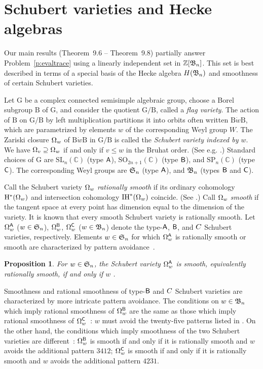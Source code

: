 \documentclass[11pt]{article}
\newtheorem{prop}[theo]{Proposition}
\theoremstyle{definition}
\numberwithin{equation}{section}
\begin{document}
\section{Schubert varieties and Hecke algebras}\label{s:schuberthecke}

Our main results (Theorem~9.6 --
Theorem~9.8)
partially answer
Problem~\ref{p:evaltrace} using a linearly independent set in $\mathbb{Z}[\mathfrak{B}_n]$.
This set is best described in terms of a special basis of the
Hecke algebra $H(\mathfrak{B}_n)$ and smoothness of certain Schubert varieties.


Let $\mathrm G$ be a complex connected semisimple algebraic group,
choose a Borel subgroup $\mathrm B$ of $\mathrm G$, and consider
the quotient
$\mathrm G/\mathrm B$,
called a {\em flag variety}.
The action of $\mathrm B$ on $\mathrm G/\mathrm B$ by left multiplication 
partitions
it
into orbits often written
$\mathrm B\dot w\mathrm B$,
which are
parametrized by elements $w$ of the corresponding Weyl group $W$.
The Zariski closure $\Omega_{w}$ of
$\mathrm B \dot w \mathrm B$
in $\mathrm G/\mathrm B$
is called the {\em Schubert variety indexed by $w$}.
We have
$\Omega_{v} \supseteq \Omega_{w}$ if and only if $v \leq w$ in the Bruhat order.
(See e.g. \cite[\S \,4.7]{BilleyLak}.)
Standard choices of $\mathrm G$
are
$\mathrm{SL}_n(\mathbb C)$
(type $\mathsf{A}$),
$\mathrm{SO}_{2n+1}(\mathbb C)$
(type $\mathsf{B}$),
and $\mathrm{SP}_{n}(\mathbb C)$
(type $\mathsf{C}$).
The corresponding Weyl groups are $\mathfrak{S}_n$ (type $\mathsf{A}$), and
$\mathfrak{B}_n$
(types $\mathsf{B}$ and $\mathsf{C}$).

Call the Schubert variety $\Omega_{w}$ {\em rationally smooth} if
its ordinary cohomology $\mathrm{H}^*(\Omega_{w})$ and
intersection cohomology $\mathrm{IH}^*(\Omega_{w})$ coincide.
(See \cite[Ch.\,6]{BilleyLak}.)
Call $\Omega_{w}$ {\em smooth} if the tangent space at every
point has dimension equal to the dimension of the variety.
It is known that every smooth
Schubert variety is rationally smooth.
Let $\Omega_{w}^{\mathsf{A}}$ ($w \in \mathfrak{S}_n$), $\Omega_{w}^{\mathsf{B}}$, $\Omega_{w}^{\mathsf{C}}$ ($w \in \mathfrak{B}_n$)
denote the type-$\mathsf{A}$,
$\mathsf{B}$, and
$\sfC$ Schubert varieties,
respectively.  Elements $w \in \mathfrak{S}_n$ for which $\Omega_{w}^{\mathsf{A}}$ is rationally
smooth or smooth are characterized by pattern avoidance~\cite{LakSan}.
\begin{prop}\label{p:aavoid}
  For $w \in \mathfrak{S}_n$,
  the
  Schubert variety
  $\Omega_{w}^{\mathsf{A}}$
  is smooth, equivalently rationally smooth,
  if and only if $w$ \avoidsp.
\end{prop}

Smoothness and rational smoothness of type-$\mathsf{B}$ and
$\sfC$
Schubert varieties are characterized by more intricate pattern avoidance.
The conditions on $w \in \mathfrak{B}_n$ which imply
rational smoothness of
$\Omega_{w}^{\mathsf{B}}$
are the same as those which imply
rational smoothness of
$\Omega_{w}^{\mathsf{C}}$~\cite[Thm.\,4.2]{BilleyPattern}:
$w$ must avoid the twenty-five
patterns listed in \cite[Eq.\,(13.3.5)]{BilleyLak}.
On the other hand, the conditions which imply smoothness of the two
Schubert varieties are different~\cite[Thm.\,8.3.17]{BilleyLak}:
$\Omega_{w}^{\mathsf{B}}$
is smooth if and only if it is rationally smooth and
$w$ avoids the additional pattern $3412$;
$\Omega_{w}^{\mathsf{C}}$
is smooth if and only if it is rationally smooth and
$w$ avoids the additional pattern $4231$.
\end{document}
